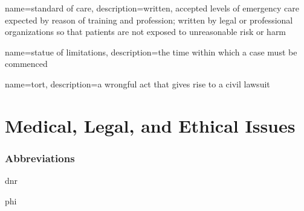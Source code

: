 \documentclass[../../EMT-169.tex]{subfiles}
\begin{document}
	{
		name=standard of care,
		description={written, accepted levels of emergency care expected by reason of training and profession; written by legal or professional organizations so that patients are not exposed to unreasonable risk or harm}
	}
	
	{
		name=statue of limitations,
		description={the time within which a case must be commenced}
	}

	{
		name=tort,
		description={a wrongful act that gives rise to a civil lawsuit}
	}


\chapter{Medical, Legal, and Ethical Issues}

\subsection*{Abbreviations}
\begin{description}[leftmargin=!,labelwidth=\widthof{\bfseries ABCD}]
	\item [\acrshort{dnr}] 		\acrlong{dnr}
	\item [\acrshort{phi}] 		\acrlong{phi}
\end{description}
\end{document}
